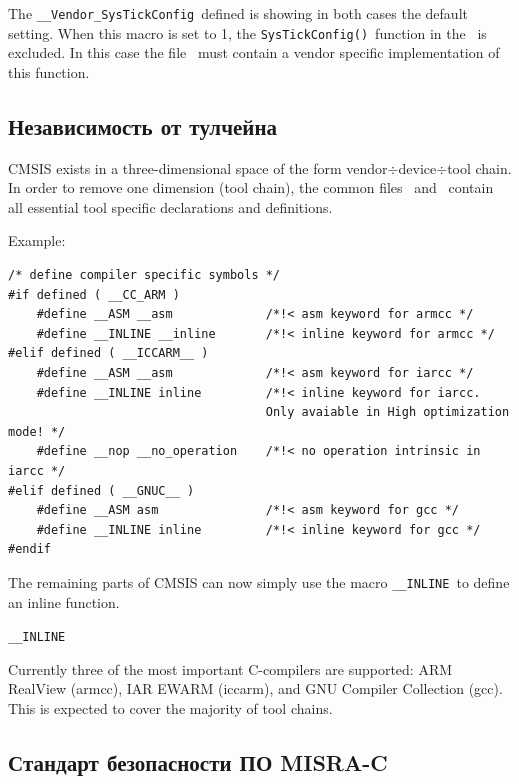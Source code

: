 The \verb"__Vendor_SysTickConfig"\ defined is showing in both cases the default
setting. When this macro is set to 1, the \verb|SysTickConfig()|\ function in
the \ is excluded. In this case the file 
\ must contain a vendor specific implementation of this
function.

\subsection{Независимость от тулчейна}

CMSIS exists in a three-dimensional space of the form
vendor$\div$device$\div$tool chain.
In order to remove one dimension (tool chain), the common files
\ and \ contain all essential tool specific
declarations and definitions.

\bigskip
Example:

\begin{lstlisting}[style=cpp]
/* define compiler specific symbols */
#if defined ( __CC_ARM )
	#define __ASM __asm				/*!< asm keyword for armcc */
	#define __INLINE __inline		/*!< inline keyword for armcc */
#elif defined ( __ICCARM__ )
	#define __ASM __asm				/*!< asm keyword for iarcc */
	#define __INLINE inline			/*!< inline keyword for iarcc.
									Only avaiable in High optimization mode! */
	#define __nop __no_operation	/*!< no operation intrinsic in iarcc */
#elif defined ( __GNUC__ )
	#define __ASM asm 				/*!< asm keyword for gcc */
	#define __INLINE inline 		/*!< inline keyword for gcc */
#endif
\end{lstlisting}

The remaining parts of CMSIS can now simply use the macro \verb|__INLINE|\ to
define an inline function.

\verb|__INLINE|\ 

\bigskip
Currently three of the most important C-compilers are supported: ARM RealView
(armcc), IAR EWARM (iccarm), and GNU Compiler Collection (gcc). This is expected
to cover the majority of tool chains.


\subsection{Стандарт безопасности ПО MISRA-C}

